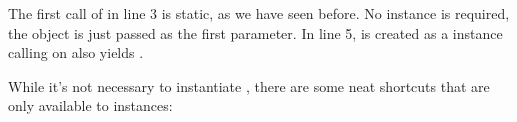 \documentclass[a4paper,10pt,english]{sphinxmanual}
\begin{document}
\begin{sphinxVerbatim}[commandchars=\\\{\},numbers=left,firstnumber=1,stepnumber=1]
  \PYG{p}{[}  \PYG{p}{[}   \PYG{p}{]} \PYG{p}{[}  \PYG{p}{]}\PYG{p}{]}
 
  
\end{sphinxVerbatim}

\sphinxAtStartPar
The first call of  in line 3 is static, as we have seen before. No  instance is required, the object  is just passed as the first parameter. In line 5,  is created as a \sphinxhyphen{}instance \textendash{} calling  on  also yields .

\sphinxAtStartPar
While it’s not necessary to instantiate , there are some neat shortcuts that are only available to \sphinxhyphen{}instances:
\end{document}
